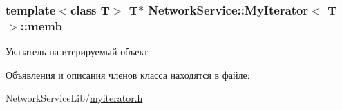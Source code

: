 \subsubsection[{memb}]{\setlength{\rightskip}{0pt plus 5cm}template$<$class T$>$ T$\ast$ {\bf Network\+Service\+::\+My\+Iterator}$<$ T $>$\+::memb\hspace{0.3cm}{\ttfamily [private]}}\label{class_network_service_1_1_my_iterator_a72858d4e9cc8cc8154f9e028ffa09aa7}


Указатель на итерируемый объект 



Объявления и описания членов класса находятся в файле\+:\begin{DoxyCompactItemize}
\item 
Network\+Service\+Lib/\hyperlink{myiterator_8h}{myiterator.\+h}\end{DoxyCompactItemize}
